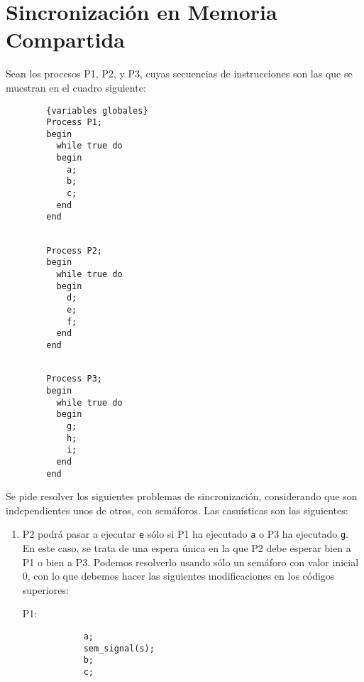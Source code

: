 \section{Sincronización en Memoria Compartida}

\begin{ejercicio}
    Sean los procesos P1, P2, y P3, cuyas secuencias de instrucciones son las que se muestran en el cuadro siguiente:
    \setlength{\columnsep}{1cm} %
    \begin{multicols}{3}
        \begin{verbatim}
        {variables globales}
        Process P1;
        begin
          while true do
          begin
            a;
            b;
            c;
          end
        end
        \end{verbatim}
        
        \begin{verbatim}
            
        Process P2;
        begin
          while true do
          begin
            d;
            e;
            f;
          end
        end
        \end{verbatim}

        \begin{verbatim}
        
        Process P3;
        begin
          while true do
          begin
            g;
            h;
            i;
          end
        end
        \end{verbatim}
    \end{multicols}

    Se pide resolver los siguientes problemas de sincronización, considerando que son independientes unos de otros, con semáforos. Las casuísticas son las siguientes:
    \begin{enumerate}
        \item P2 podrá pasar a ejecutar \verb|e| sólo si P1 ha ejecutado \verb|a| o P3 ha ejecutado \verb|g|.\\

            En este caso, se trata de una espera única en la que P2 debe esperar bien a P1 o bien a P3. Podemos resolverlo usando sólo un semáforo con valor inicial 0, con lo que debemos hacer las siguientes modificaciones en los códigos superiores:
    \setlength{\columnsep}{1cm} %
    \begin{multicols}{3}
        P1:
        \begin{verbatim}
            a;
            sem_signal(s);
            b;
            c;
        \end{verbatim}
        

\end{multicols}
\end{enumerate}
\end{ejercicio}
